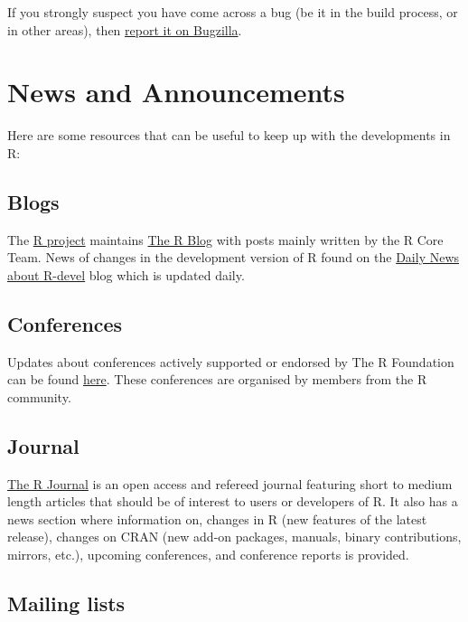 \documentclass[
]{book}
\begin{document}
If you strongly suspect you have come across a bug (be it in the build process, or in other areas), then \protect\hyperlink{ReportBug}{report it on Bugzilla}.

\hypertarget{News}{%
\chapter{News and Announcements}\label{News}}

Here are some resources that can be useful to keep up with the developments in R:

\hypertarget{blogs}{%
\section{Blogs}\label{blogs}}

The \href{https://www.r-project.org/}{R project} maintains \href{https://blog.r-project.org/}{The R Blog} with posts mainly written by the R Core Team. News of changes in the development version of R found on the \href{https://developer.r-project.org/blosxom.cgi/R-devel}{Daily News about R-devel} blog which is updated daily.

\hypertarget{conferences}{%
\section{Conferences}\label{conferences}}

Updates about conferences actively supported or endorsed by The R Foundation can be found \href{https://www.r-project.org/conferences/}{here}. These conferences are organised by members from the R community.

\hypertarget{journal}{%
\section{Journal}\label{journal}}

\href{https://journal.r-project.org/}{The R Journal} is an open access and refereed journal featuring short to medium length articles that should be of interest to users or developers of R. It also has a news section where information on, changes in R (new features of the latest release), changes on CRAN (new add-on packages, manuals, binary contributions, mirrors, etc.), upcoming conferences, and conference reports is provided.

\hypertarget{mailing-lists-1}{%
\section{Mailing lists}\label{mailing-lists-1}}
\end{document}
